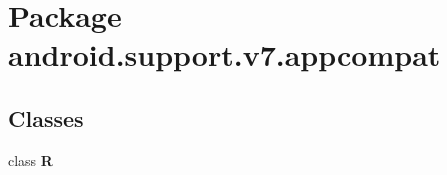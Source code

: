 \section{Package android.\+support.\+v7.\+appcompat}
\label{namespaceandroid_1_1support_1_1v7_1_1appcompat}
\subsection*{Classes}
\begin{DoxyCompactItemize}
\item 
class \textbf{ R}
\end{DoxyCompactItemize}
